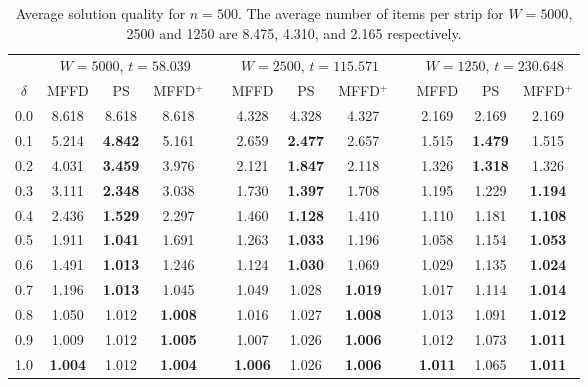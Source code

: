 \documentclass[runningheads]{llncs}
\begin{document}
\begin{table}[!htb]
	\centering
	\caption{Average solution quality for $n = 500$. The average number of items per strip for $W = 5000$, 2500 and 1250 are 8.475, 4.310, and 2.165 respectively.}
	\begin{tabular}{@{}c@{\hspace{15pt}}c@{\hspace{7pt}}c@{\hspace{5pt}}ccc@{\hspace{7pt}}c@{\hspace{5pt}}ccc@{\hspace{7pt}}c@{\hspace{5pt}}c@{}}\toprule
		& \multicolumn{3}{c}{$W = 5000$, $t = 58.039$} && \multicolumn{3}{c}{$W = 2500$, $t = 115.571$} && \multicolumn{3}{c}{$W = 1250$, $t = 230.648$} \\
		\cmidrule{2-4} \cmidrule{6-8} \cmidrule{10-12}
		$\delta$ & MFFD & PS & MFFD$^+$ && MFFD & PS & MFFD$^+$ && MFFD & PS & MFFD$^+$\\ \midrule
		0.0 & 8.618 & 8.618 & 8.618 && 4.328 & 4.328 & 4.327 && 2.169 & 2.169 & 2.169 \\
		0.1 & 5.214 & \textbf{4.842} & 5.161 && 2.659 & \textbf{2.477} & 2.657 && 1.515 & \textbf{1.479} & 1.515 \\
		0.2 & 4.031 & \textbf{3.459} & 3.976 && 2.121 & \textbf{1.847} & 2.118 && 1.326 & \textbf{1.318} & 1.326 \\
		0.3 & 3.111 & \textbf{2.348} & 3.038 && 1.730 & \textbf{1.397} & 1.708 && 1.195 & 1.229 & \textbf{1.194} \\
		0.4 & 2.436 & \textbf{1.529} & 2.297 && 1.460 & \textbf{1.128} & 1.410 && 1.110 & 1.181 & \textbf{1.108} \\
		0.5 & 1.911 & \textbf{1.041} & 1.691 && 1.263 & \textbf{1.033} & 1.196 && 1.058 & 1.154 & \textbf{1.053} \\
		0.6 & 1.491 & \textbf{1.013} & 1.246 && 1.124 & \textbf{1.030} & 1.069 && 1.029 & 1.135 & \textbf{1.024} \\
		0.7 & 1.196 & \textbf{1.013} & 1.045 && 1.049 & 1.028 & \textbf{1.019} && 1.017 & 1.114 & \textbf{1.014} \\
		0.8 & 1.050 & 1.012 & \textbf{1.008} && 1.016 & 1.027 & \textbf{1.008} && 1.013 & 1.091 & \textbf{1.012} \\
		0.9 & 1.009 & 1.012 & \textbf{1.005} && 1.007 & 1.026 & \textbf{1.006} && 1.012 & 1.073 & \textbf{1.011} \\
		1.0 & \textbf{1.004} & 1.012 & \textbf{1.004} && \textbf{1.006} & 1.026 & \textbf{1.006} && \textbf{1.011} & 1.065 & \textbf{1.011} \\
		\bottomrule
	\end{tabular}	
	\label{table:n=500}
\end{table}
\end{document}
